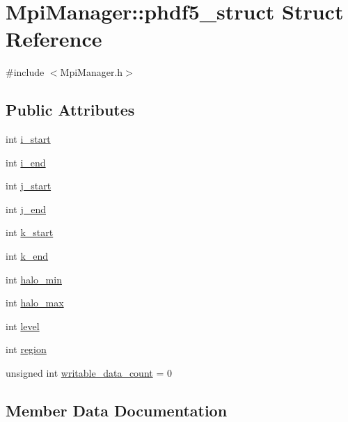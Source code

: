 \hypertarget{struct_mpi_manager_1_1phdf5__struct}{}\section{Mpi\+Manager\+:\+:phdf5\+\_\+struct Struct Reference}
\label{struct_mpi_manager_1_1phdf5__struct}


{\ttfamily \#include $<$Mpi\+Manager.\+h$>$}

\subsection*{Public Attributes}
\begin{DoxyCompactItemize}
\item 
int \hyperlink{struct_mpi_manager_1_1phdf5__struct_a971e8f56e0d69005cb639a74250bbb70}{i\+\_\+start}
\item 
int \hyperlink{struct_mpi_manager_1_1phdf5__struct_a28567c9488624c7de401c9ee5c5fa13e}{i\+\_\+end}
\item 
int \hyperlink{struct_mpi_manager_1_1phdf5__struct_aff0715d84f3e46f8cca3a380add110e3}{j\+\_\+start}
\item 
int \hyperlink{struct_mpi_manager_1_1phdf5__struct_ac8869bc50d30230032e13dd5bfe7d1fe}{j\+\_\+end}
\item 
int \hyperlink{struct_mpi_manager_1_1phdf5__struct_a94d1c88859049aa2b37c9b659e071760}{k\+\_\+start}
\item 
int \hyperlink{struct_mpi_manager_1_1phdf5__struct_a2490c17798ca6cf4db002fa521f170c0}{k\+\_\+end}
\item 
int \hyperlink{struct_mpi_manager_1_1phdf5__struct_a1ea3307d7dac34273ee8a7b1014273fe}{halo\+\_\+min}
\item 
int \hyperlink{struct_mpi_manager_1_1phdf5__struct_af6509514433ef18c04217b54ce4614a0}{halo\+\_\+max}
\item 
int \hyperlink{struct_mpi_manager_1_1phdf5__struct_aa3f8cc807724b61ef3a37509f71100ab}{level}
\item 
int \hyperlink{struct_mpi_manager_1_1phdf5__struct_a1a9978693d5b50cb83b8ccc78fb23a6d}{region}
\item 
unsigned int \hyperlink{struct_mpi_manager_1_1phdf5__struct_a5b487966cec847dfba96a869e9adb7f0}{writable\+\_\+data\+\_\+count} = 0
\end{DoxyCompactItemize}


\subsection{Member Data Documentation}
